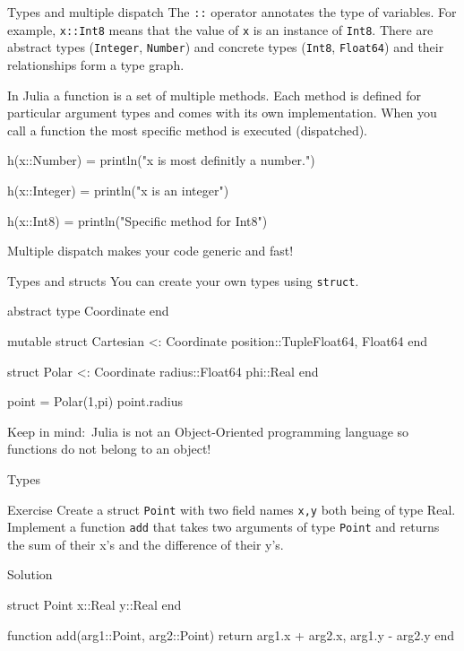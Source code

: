 \documentclass{beamer}
\newenvironment{Boxx}{\begin{tcolorbox}[standard jigsaw, opacityframe=0.8, opacityback=0.0]}{\end{tcolorbox}}
\begin{document}
\begin{frame}[fragile]{Types and multiple dispatch}
	The \verb|::| operator annotates the type of variables. For example, \verb|x::Int8| means that the value of \verb|x| is an instance of \verb|Int8|. There are abstract types (\verb|Integer|, \verb|Number|) and concrete types (\verb|Int8|, \verb|Float64|) and their relationships form a type graph.
	\vspace*{5mm}
	
	In Julia a function is a set of multiple methods. Each method is defined for particular argument types and comes with its own implementation. When you call a function the most specific method is executed (dispatched).
	\begin{Boxx}
	\begin{jllisting}
  h(x::Number) = println("x is most definitly a number.")

  h(x::Integer) = println("x is an integer")
  
  h(x::Int8) = println("Specific method for Int8")
	\end{jllisting}
\end{Boxx}
Multiple dispatch makes your code generic and fast!
\end{frame}


\begin{frame}[fragile]{Types and structs}
 You can create your own types using \verb|struct|.
 \begin{Boxx}
  \begin{jllisting}
  abstract type Coordinate end
  
  mutable struct Cartesian <: Coordinate
    position::Tuple{Float64, Float64}
  end
  
  struct Polar <: Coordinate
    radius::Float64
    phi::Real
  end
  
  point = Polar(1,pi)
  point.radius
  \end{jllisting}
\end{Boxx}
Keep in mind:~Julia is not an Object-Oriented programming language so functions do not belong to an object!
\end{frame}

\begin{frame}[fragile]{Types}
	\begin{block}{Exercise}
		Create a struct \verb|Point| with two field names \verb|x,y| both being of type Real. Implement a function \verb|add| that takes two arguments of type \verb|Point| and returns the sum of their x's and the difference of their y's.
	\end{block}
	\vfill
	\begin{block}{Solution}
			\vspace*{1mm}
		\begin{jllisting}
  struct Point
    x::Real
    y::Real
  end
  
  function add(arg1::Point, arg2::Point)
    return arg1.x + arg2.x, arg1.y - arg2.y
  end
		\end{jllisting}
		\vspace*{1mm}
	\end{block}
\end{frame}
\end{document}
